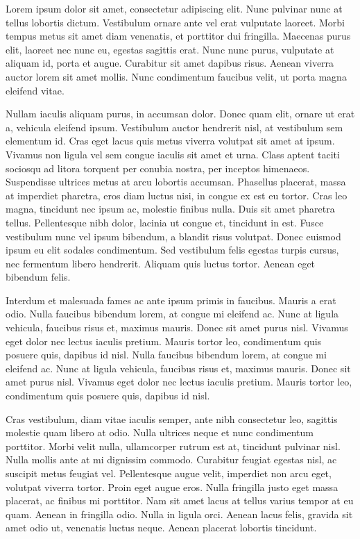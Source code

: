 \initial Lorem ipsum dolor sit amet, consectetur adipiscing elit. Nunc pulvinar nunc at tellus lobortis dictum. Vestibulum ornare ante vel erat vulputate laoreet. Morbi tempus metus sit amet diam venenatis, et porttitor dui fringilla. Maecenas purus elit, laoreet nec nunc eu, egestas sagittis erat. Nunc nunc purus, vulputate at aliquam id, porta et augue. Curabitur sit amet dapibus risus. Aenean viverra auctor lorem sit amet mollis. Nunc condimentum faucibus velit, ut porta magna eleifend vitae.

\initial Nullam iaculis aliquam purus, in accumsan dolor. Donec quam elit, ornare ut erat a, vehicula eleifend ipsum. Vestibulum auctor hendrerit nisl, at vestibulum sem elementum id. Cras eget lacus quis metus viverra volutpat sit amet at ipsum. Vivamus non ligula vel sem congue iaculis sit amet et urna. Class aptent taciti sociosqu ad litora torquent per conubia nostra, per inceptos himenaeos. Suspendisse ultrices metus at arcu lobortis accumsan. Phasellus placerat, massa at imperdiet pharetra, eros diam luctus nisi, in congue ex est eu tortor. Cras leo magna, tincidunt nec ipsum ac, molestie finibus nulla. Duis sit amet pharetra tellus. Pellentesque nibh dolor, lacinia ut congue et, tincidunt in est. Fusce vestibulum nunc vel ipsum bibendum, a blandit risus volutpat. Donec euismod ipsum eu elit sodales condimentum. Sed vestibulum felis egestas turpis cursus, nec fermentum libero hendrerit. Aliquam quis luctus tortor. Aenean eget bibendum felis.

\initial Interdum et malesuada fames ac ante ipsum primis in faucibus. Mauris a erat odio. Nulla faucibus bibendum lorem, at congue mi eleifend ac. Nunc at ligula vehicula, faucibus risus et, maximus mauris. Donec sit amet purus nisl. Vivamus eget dolor nec lectus iaculis pretium. Mauris tortor leo, condimentum quis posuere quis, dapibus id nisl. Nulla faucibus bibendum lorem, at congue mi eleifend ac. Nunc at ligula vehicula, faucibus risus et, maximus mauris. Donec sit amet purus nisl. Vivamus eget dolor nec lectus iaculis pretium. Mauris tortor leo, condimentum quis posuere quis, dapibus id nisl.

\initial Cras vestibulum, diam vitae iaculis semper, ante nibh consectetur leo, sagittis molestie quam libero at odio. Nulla ultrices neque et nunc condimentum porttitor. Morbi velit nulla, ullamcorper rutrum est at, tincidunt pulvinar nisl. Nulla mollis ante at mi dignissim commodo. Curabitur feugiat egestas nisl, ac suscipit metus feugiat vel. Pellentesque augue velit, imperdiet non arcu eget, volutpat viverra tortor. Proin eget augue eros. Nulla fringilla justo eget massa placerat, ac finibus mi porttitor. Nam sit amet lacus at tellus varius tempor at eu quam. Aenean in fringilla odio. Nulla in ligula orci. Aenean lacus felis, gravida sit amet odio ut, venenatis luctus neque. Aenean placerat lobortis tincidunt.

